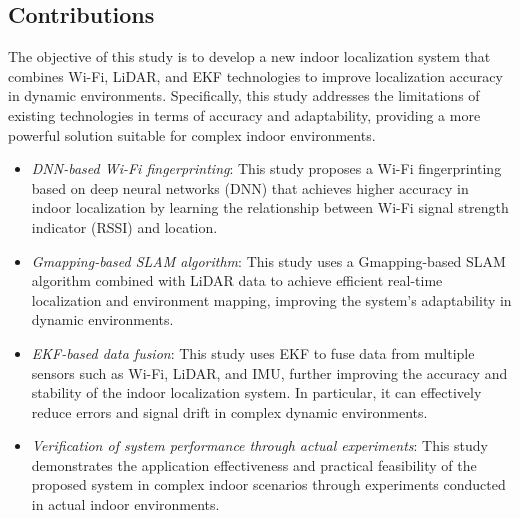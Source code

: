 \documentclass[12pt,a4paper]{article}
\numberwithin{equation}{section}
\begin{document}
\subsection{Contributions}
The objective of this study is to develop a new indoor localization system that
combines Wi-Fi, LiDAR, and EKF technologies to improve localization accuracy in
dynamic environments. Specifically, this study addresses the limitations of
existing technologies in terms of accuracy and adaptability, providing a more
powerful solution suitable for complex indoor environments.
\begin{itemize}
\item \textit{DNN-based Wi-Fi fingerprinting}: This study proposes a Wi-Fi
  fingerprinting based on deep neural networks (DNN) that achieves higher
  accuracy in indoor localization by learning the relationship between Wi-Fi
  signal strength indicator (RSSI) and location.
    
\item \textit{Gmapping-based SLAM algorithm}: This study uses a Gmapping-based
  SLAM algorithm combined with LiDAR data to achieve efficient real-time
  localization and environment mapping, improving the system's adaptability in
  dynamic environments.
    
\item \textit{EKF-based data fusion}: This study uses EKF to fuse data from
  multiple sensors such as Wi-Fi, LiDAR, and IMU, further improving the accuracy
  and stability of the indoor localization system. In particular, it can
  effectively reduce errors and signal drift in complex dynamic environments.
    
\item \textit{Verification of system performance through actual experiments}:
  This study demonstrates the application effectiveness and practical
  feasibility of the proposed system in complex indoor scenarios through
  experiments conducted in actual indoor environments.
\end{itemize}
\end{document}
